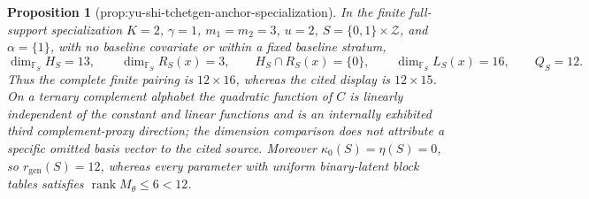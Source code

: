 \documentclass{article}
\newtheorem{proposition}{Proposition}
\begin{document}
\begin{proposition}[prop:yu-shi-tchetgen-anchor-specialization]\label{prop:yu-shi-tchetgen-anchor-specialization}
In the finite full-support specialization \(K=2\), \(\gamma=1\), \(m_1=m_2=3\), \(u=2\), \(S=\{0,1\}\times\mathcal Z\), and \(\alpha=\{1\}\), with no baseline covariate or within a fixed baseline stratum,
\[
\dim_{\mathbb F_S}H_S=13,
\qquad
\dim_{\mathbb F_S}R_S(x)=3,
\qquad
H_S\cap R_S(x)=\{0\},
\qquad
\dim_{\mathbb F_S}L_S(x)=16,
\qquad
Q_S=12.
\]
Thus the complete finite pairing is \(12\times16\), whereas the cited display is \(12\times15\). On a ternary complement alphabet the quadratic function of \(C\) is linearly independent of the constant and linear functions and is an internally exhibited third complement-proxy direction; the dimension comparison does not attribute a specific omitted basis vector to the cited source. Moreover \(\kappa_0(S)=\eta(S)=0\), so \(r_{\mathrm{gen}}(S)=12\), whereas every parameter with uniform binary-latent block tables satisfies \(\operatorname{rank}M_\theta\leq6<12\).
\end{proposition}
\end{document}
